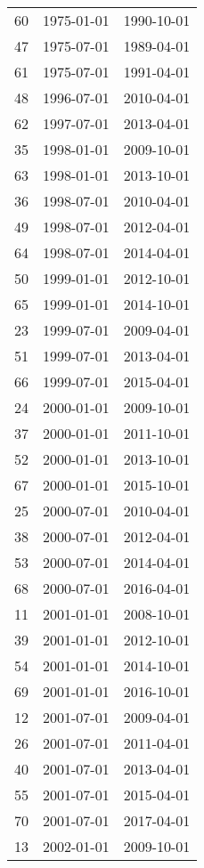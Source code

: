 % 
\begin{tabular}{ccc}
  \hline
  \hline
60 & 1975-01-01 & 1990-10-01 \\ 
  47 & 1975-07-01 & 1989-04-01 \\ 
  61 & 1975-07-01 & 1991-04-01 \\ 
  48 & 1996-07-01 & 2010-04-01 \\ 
  62 & 1997-07-01 & 2013-04-01 \\ 
  35 & 1998-01-01 & 2009-10-01 \\ 
  63 & 1998-01-01 & 2013-10-01 \\ 
  36 & 1998-07-01 & 2010-04-01 \\ 
  49 & 1998-07-01 & 2012-04-01 \\ 
  64 & 1998-07-01 & 2014-04-01 \\ 
  50 & 1999-01-01 & 2012-10-01 \\ 
  65 & 1999-01-01 & 2014-10-01 \\ 
  23 & 1999-07-01 & 2009-04-01 \\ 
  51 & 1999-07-01 & 2013-04-01 \\ 
  66 & 1999-07-01 & 2015-04-01 \\ 
  24 & 2000-01-01 & 2009-10-01 \\ 
  37 & 2000-01-01 & 2011-10-01 \\ 
  52 & 2000-01-01 & 2013-10-01 \\ 
  67 & 2000-01-01 & 2015-10-01 \\ 
  25 & 2000-07-01 & 2010-04-01 \\ 
  38 & 2000-07-01 & 2012-04-01 \\ 
  53 & 2000-07-01 & 2014-04-01 \\ 
  68 & 2000-07-01 & 2016-04-01 \\ 
  11 & 2001-01-01 & 2008-10-01 \\ 
  39 & 2001-01-01 & 2012-10-01 \\ 
  54 & 2001-01-01 & 2014-10-01 \\ 
  69 & 2001-01-01 & 2016-10-01 \\ 
  12 & 2001-07-01 & 2009-04-01 \\ 
  26 & 2001-07-01 & 2011-04-01 \\ 
  40 & 2001-07-01 & 2013-04-01 \\ 
  55 & 2001-07-01 & 2015-04-01 \\ 
  70 & 2001-07-01 & 2017-04-01 \\ 
  13 & 2002-01-01 & 2009-10-01 \\ 

\end{tabular}
